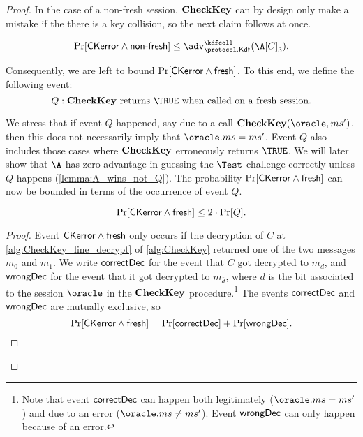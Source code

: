 \begin{proof}
In the case of a non-fresh session,
$\mathbf{CheckKey}$ can by design only make a mistake if the there is a key collision,
so the next claim follows at once.

\begin{claim}\label{claim:EAP-TLS:CKerror&not-fresh<KDFcoll}
\begin{equation}
	\Pr[\CKerror \land \nfresh] \leq \adv_{\protocol.\mathsf{Kdf}}^{\kdfcoll}(\A[C]_3) .
\end{equation}
\end{claim}

Consequently,
we are left to bound $\Pr[\mathsf{CKerror} \land \mathsf{fresh}]$.
To this end,
we define the following event:
\begin{equation}\label{eq:def:event_Q}
	Q: \CK \text{ returns $\TRUE$ when called on a fresh session}.
\end{equation}  

We stress that if event $Q$ happened,
say due to a call $\CK(\oracle,ms')$,
then this does not necessarily imply that $\oracle .ms = ms'$.
Event $Q$ also includes those cases where $\mathbf{CheckKey}$ erroneously returns $\TRUE$.
We will later show that $\A$ has zero advantage in guessing the $\Test$-challenge correctly unless $Q$ happens (\cref{lemma:A_wins_not_Q}).
The probability $\Pr[\mathsf{CKerror} \land \mathsf{fresh}]$ can now be bounded in terms of the occurrence of event $Q$.

\begin{claim}\label{claim:EAP-TLS:CKerror&fresh<Q}
\begin{equation}
	\Pr[\mathsf{CKerror} \land \mathsf{fresh}] \leq 2 \cdot \Pr[Q] .
\end{equation}
\end{claim}


\begin{proof}

Event $\mathsf{CKerror} \land \mathsf{fresh}$ only occurs if the decryption of $C$ at \cref{alg:CheckKey_line_decrypt} of \cref{alg:CheckKey} returned one of the two messages $m_0$ and $m_1$.
We write $\mathsf{correctDec}$ for the event that $C$ got decrypted to $m_d$,
and $\mathsf{wrongDec}$ for the event that it got decrypted to $m_{\overline{d}}$,
where $d$ is the bit associated to the session $\oracle$ in the $\mathbf{CheckKey}$ procedure.\footnote{Note that event $\mathsf{correctDec}$ can happen both legitimately 
($\oracle.ms = ms'$) and due to an error ($\oracle.ms \neq ms'$).
Event $\mathsf{wrongDec}$ can only happen because of an error.}
The events $\mathsf{correctDec}$ and $\mathsf{wrongDec}$ are mutually exclusive,
so 
\begin{equation}
	\Pr[\mathsf{CKerror} \land \mathsf{fresh}] = \Pr[\mathsf{correctDec}] + \Pr[\mathsf{wrongDec}] .
\end{equation}


\end{proof}
\end{proof}
